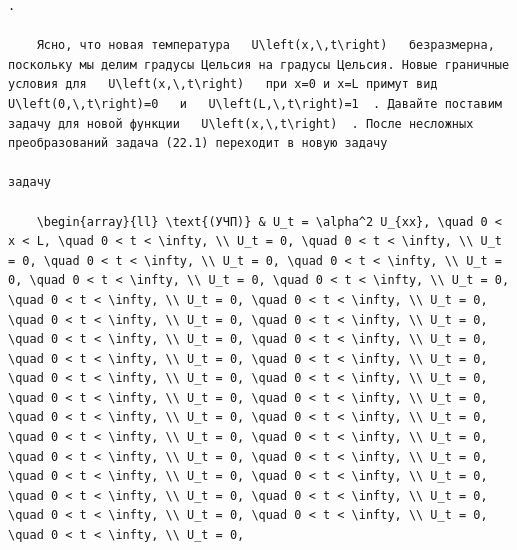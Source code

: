 \documentclass[
  ukrainian,
]{article}
\begin{document}
\begin{verbatim}
.

    Ясно, что новая температура   U\left(x,\,t\right)   безразмерна, поскольку мы делим градусы Цельсия на градусы Цельсия. Новые граничные условия для   U\left(x,\,t\right)   при x=0 и x=L примут вид   U\left(0,\,t\right)=0   и   U\left(L,\,t\right)=1  . Давайте поставим задачу для новой функции   U\left(x,\,t\right)  . После несложных преобразований задача (22.1) переходит в новую задачу

задачу

    \begin{array}{ll} \text{(УЧП)} & U_t = \alpha^2 U_{xx}, \quad 0 < x < L, \quad 0 < t < \infty, \\ U_t = 0, \quad 0 < t < \infty, \\ U_t = 0, \quad 0 < t < \infty, \\ U_t = 0, \quad 0 < t < \infty, \\ U_t = 0, \quad 0 < t < \infty, \\ U_t = 0, \quad 0 < t < \infty, \\ U_t = 0, \quad 0 < t < \infty, \\ U_t = 0, \quad 0 < t < \infty, \\ U_t = 0, \quad 0 < t < \infty, \\ U_t = 0, \quad 0 < t < \infty, \\ U_t = 0, \quad 0 < t < \infty, \\ U_t = 0, \quad 0 < t < \infty, \\ U_t = 0, \quad 0 < t < \infty, \\ U_t = 0, \quad 0 < t < \infty, \\ U_t = 0, \quad 0 < t < \infty, \\ U_t = 0, \quad 0 < t < \infty, \\ U_t = 0, \quad 0 < t < \infty, \\ U_t = 0, \quad 0 < t < \infty, \\ U_t = 0, \quad 0 < t < \infty, \\ U_t = 0, \quad 0 < t < \infty, \\ U_t = 0, \quad 0 < t < \infty, \\ U_t = 0, \quad 0 < t < \infty, \\ U_t = 0, \quad 0 < t < \infty, \\ U_t = 0, \quad 0 < t < \infty, \\ U_t = 0, \quad 0 < t < \infty, \\ U_t = 0, \quad 0 < t < \infty, \\ U_t = 0, \quad 0 < t < \infty, \\ U_t = 0, \quad 0 < t < \infty, \\ U_t = 0, \quad 0 < t < \infty, \\ U_t = 0, \quad 0 < t < \infty, \\ U_t = 0, \quad 0 < t < \infty, \\ U_t = 0, 
\end{verbatim}
\end{document}
